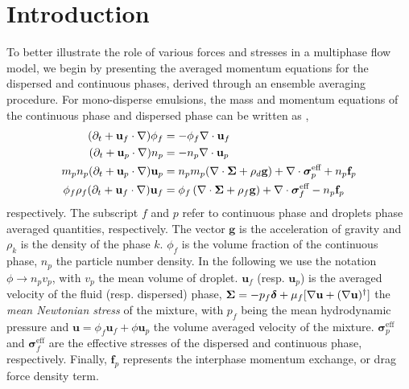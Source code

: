 \section{Introduction}

To better illustrate the role of various forces and stresses in a multiphase flow model, we begin by presenting the averaged momentum equations for the dispersed and continuous phases, derived through an ensemble averaging procedure.
For mono-disperse emulsions, the mass and momentum equations of the continuous phase and dispersed phase can be written as \citep{fintzi2024averaged},
\begin{align}
    (\pddt + \textbf{u}_f  \cdot \grad) \phi_f
    &= - \phi_f \div \textbf{u}_f\\
    (\pddt + \textbf{u}_p \cdot \grad)n_p
    &=
    - n_p \div \textbf{u}_p\\
    m_pn_p (\pddt + \textbf{u}_p \cdot \grad)\textbf{u}_p
    &=
    n_pm_p(\div \bm\Sigma
    + \rho_d  \textbf{g})
    + \div \bm\sigma_p^\text{eff}
    + n_p\textbf{f}_p
    \\
    \phi_f \rho_f(\pddt + \textbf{u}_f  \cdot \grad) \textbf{u}_f
    &= \phi_f 
    \left(\div \bm{\Sigma}
    + \rho_f \textbf{g}\right)
    + \div \bm\sigma_f^{\text{eff}}
    - n_p\textbf{f}_p
    \label{eq:dt_uf2}
\end{align}
respectively. 
The subscript $f$ and $p$ refer to continuous phase and droplets phase averaged quantities, respectively.
The vector $\textbf{g}$ is the acceleration of gravity and $\rho_k$ is the density of the phase $k$. 
$\phi_f$ is the volume fraction of the continuous phase, $n_p$ the particle number density.
In the following we use the notation $\phi \to n_p v_p$, with $v_p$ the mean volume of droplet.
$\textbf{u}_f$ (resp. $\textbf{u}_p$) is the averaged velocity of the fluid (resp. dispersed) phase, $\bm\Sigma = - p_f \bm\delta + \mu_f [\mathbf{\nabla} \textbf{u} +  (\mathbf{\nabla} \textbf{u})^\dagger ]$ the \textit{mean Newtonian stress} of the mixture, with $p_f$ being the mean hydrodynamic pressure and $\textbf{u}=\phi_f \textbf{u}_f + \phi \textbf{u}_p$ the volume averaged velocity of the mixture.
$\bm{\sigma}^{\text{eff}}_p$ and $\bm{\sigma}^{\text{eff}}_f$ are the effective stresses of the dispersed and continuous phase, respectively.  
Finally, $\textbf{f}_p$ represents the interphase momentum exchange, or drag force density term. 

